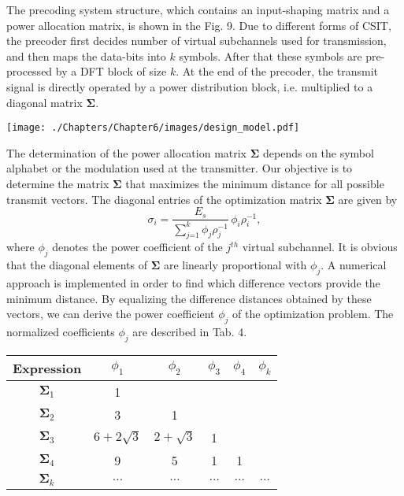 The precoding system structure, which contains an input-shaping matrix and a power allocation matrix, is shown in the Fig. 9. Due to different forms of CSIT, the precoder first decides number of virtual subchannels used for transmission, and then maps the data-bits into $k$ symbols. After that these symbols are pre-processed by a DFT block of size $k$. At the end of the precoder, the transmit signal is directly operated by a power distribution block, i.e. multiplied to a diagonal matrix $\mathbf{\Sigma}$. 
\begin{center} 
	\texttt{[image: ./Chapters/Chapter6/images/design\_model.pdf]}
\end{center}
The determination of the power allocation matrix $\mathbf{\Sigma}$ depends on the symbol alphabet or the modulation used at the transmitter. Our objective is to determine the matrix $\mathbf{\Sigma}$ that maximizes the minimum distance for all possible transmit vectors. The diagonal entries of the optimization matrix $\mathbf{\Sigma}$ are given by
\begin{equation}
\sigma_i  = \frac{E_s}{\sum_{j\text{=}1}^k  \phi_j \rho_j^{-1}} \,  \phi_i \rho_i^{-1} ,
\end{equation}
where $\phi_j$ denotes the power coefficient of the $j^{th}$ virtual subchannel. It is obvious that the diagonal elements of $\mathbf{\Sigma}$ are linearly proportional with $\phi_j$. A numerical approach is implemented in order to find which difference vectors provide the minimum distance. By equalizing the difference distances obtained by these vectors, we can derive the power coefficient $\phi_j$ of the optimization problem. The normalized coefficients $\phi_j$ are described in Tab. 4.
\begin{center}
\begin{tabular}{c|c|c|c|c|c}
	\hline
	Expression & $\phi_1$ & $\phi_ 2$ & $\phi_ 3$ & $\phi_4$ & $\phi_k$ \\
	\hline
	$\mathbf{\Sigma}_1$ & 1 &   &   &  &\\
	$\mathbf{\Sigma}_2$   & 3 & 1 &   & & \\
	$\mathbf{\Sigma}_3$   & $6+2\sqrt{3}$ & $2+\sqrt{3}$ & 1 & & \\
	$\mathbf{\Sigma}_4$ & 9 & 5 & 1 & 1 &\\
	$\mathbf{\Sigma}_k$ & $\hdots$ & $\hdots$ & $\hdots$ & $\hdots$ & $\hdots$\\
	\hline
\end{tabular}

\end{center}
 
